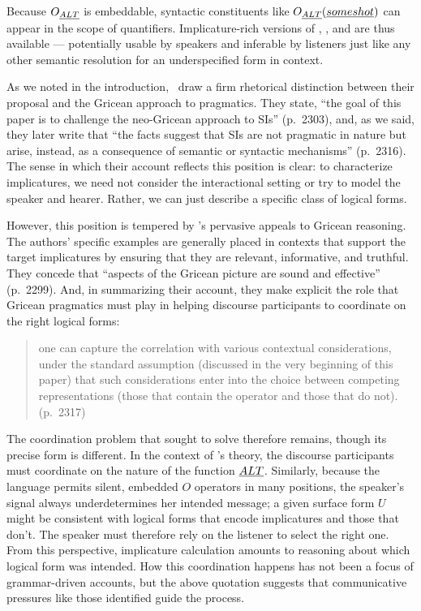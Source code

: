 \documentclass[leqno]{article}
\begin{document}
Because $O_{\emph{ALT}}$ is embeddable, syntactic constituents like
$O_{\emph{ALT}}(\emph{some shot})$ can appear in the scope of quantifiers.
Implicature-rich versions of , , and
 are thus available --- potentially usable by
speakers and inferable by listeners just like any other semantic
resolution for an underspecified form in context.

As we noted in the introduction, \CFS\ draw a firm rhetorical
distinction between their proposal and the Gricean approach to
pragmatics. They state, ``the goal of this paper is to challenge the
neo-Gricean approach to SIs'' (p.~2303), and, as we said, they later
write that ``the facts suggest that SIs are not pragmatic in nature
but arise, instead, as a consequence of semantic or syntactic
mechanisms'' (p.~2316). The sense in which their account reflects this
position is clear: to characterize implicatures, we need not consider
the interactional setting or try to model the speaker and
hearer. Rather, we can just describe a specific class of logical
forms.

However, this position is tempered by \CFS's pervasive appeals to
Gricean reasoning.  The authors' specific examples are generally
placed in contexts that support the target implicatures by ensuring
that they are relevant, informative, and truthful.  They concede that
``aspects of the Gricean picture are sound and effective''
(p.~2299). And, in summarizing their account, they make explicit the
role that Gricean pragmatics must play in helping discourse
participants to coordinate on the right logical forms:
%
\begin{quote}
  one can capture the correlation with various contextual
  considerations, under the standard assumption (discussed in the very
  beginning of this paper) that such considerations enter into the
  choice between competing representations (those that contain the
  operator and those that do not). (p.~2317)
\end{quote}

The coordination problem that \citeauthor{Grice75} sought to solve
therefore remains, though its precise form is different. In the
context of \CFS's theory, the discourse participants must coordinate on
the nature of the function $\emph{ALT}$.  Similarly, because the language
permits silent, embedded $O$ operators in many positions, the
speaker's signal always underdetermines her intended message; a given
surface form $U$ might be consistent with logical forms that encode
implicatures and those that don't. The speaker must therefore rely on
the listener to select the right one.  From this perspective,
implicature calculation amounts to reasoning about which logical form
was intended. How this coordination happens has not been a focus of
grammar-driven accounts, but the above quotation suggests that
communicative pressures like those \citeauthor{Grice75} identified
guide the process.
\end{document}
